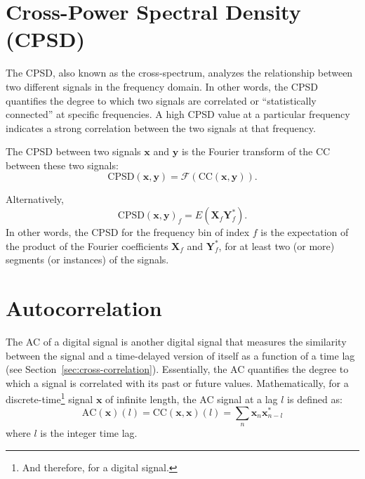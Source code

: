
\section{Cross-Power Spectral Density (CPSD)}
\label{sec:CPSD}

The \gls{CPSD}, also known as the cross-spectrum, analyzes the
relationship between two different signals in the frequency domain. In
other words, the \gls{CPSD} quantifies the degree to which two signals
are correlated or ``statistically connected'' at specific
frequencies. A high \gls{CPSD} value at a particular frequency indicates a
strong correlation between the two signals at that frequency.

The \gls{CPSD} between two signals $\mathbf{x}$ and $\mathbf{y}$ is
the Fourier transform of the \gls{CC} between these two
signals:
\begin{equation}
  \text{CPSD}(\mathbf{x},\mathbf{y})=\mathcal{F}({\text{CC}(\mathbf{x},\mathbf{y})}).
\end{equation}

Alternatively,
\begin{equation}
  \text{CPSD}(\mathbf{x},\mathbf{y})_f=E(\mathbf{X}_f\mathbf{Y}_f^*).
\end{equation}
In other words, the \gls{CPSD} for the frequency bin of index $f$ is
the expectation of the product of the Fourier coefficients
$\mathbf{X}_f$ and $\mathbf{Y}_f^*$, for at least two (or more)
segments (or instances) of the signals.


\section{Autocorrelation}
\label{sec:autocorrelation}

The \gls{AC} of a digital signal is another digital signal that
measures the similarity between the signal and a time-delayed version
of itself as a function of a time lag (see
Section~\ref{sec:cross-correlation}). Essentially, the \gls{AC}
quantifies the degree to which a signal is correlated with its past or
future values. Mathematically, for a discrete-time\footnote{And
  therefore, for a digital signal.} signal $\mathbf{x}$ of infinite
length, the \gls{AC} signal at a lag $l$ is defined as:
\begin{equation}
  \text{AC}(\mathbf{x})(l)=\text{CC}(\mathbf{x},\mathbf{x})(l)=\sum_n{\mathbf{x}}_n \mathbf{x}^*_{n-l}
\end{equation}
where $l$ is the integer time lag.

